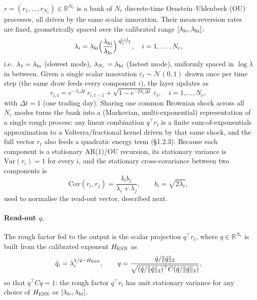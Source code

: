 \documentclass[11pt,a4paper]{article}
\begin{document}
$r=(r_1,\ldots,r_{N_r})\in\mathbb{R}^{N_r}$ is a bank of $N_r$
discrete-time Ornstein--Uhlenbeck (OU) processes, all driven by the
same scalar innovation. Their mean-reversion rates are fixed,
geometrically spaced over the calibrated range
$[\lambda_{\rm lo},\lambda_{\rm hi}]$:
\begin{equation}
  \lambda_i = \lambda_{\rm lo}\Bigl(\frac{\lambda_{\rm hi}}{\lambda_{\rm lo}}\Bigr)^{\frac{i-1}{N_r-1}},
  \quad i=1,\ldots,N_r,
  \label{eq:geomspace}
\end{equation}
i.e.\ $\lambda_1=\lambda_{\rm lo}$ (slowest mode), $\lambda_{N_r}=\lambda_{\rm
hi}$ (fastest mode), uniformly spaced in $\log\lambda$ in between.
Given a single scalar innovation $\varepsilon_t\sim\mathcal N(0,1)$
drawn once per time step (the same draw feeds every component $i$), the
layer updates as
\begin{equation}
  r_{i,t} = e^{-\lambda_i\Delta t}\,r_{i,t-1} + \sqrt{1-e^{-2\lambda_i\Delta t}}\,\varepsilon_t,
  \quad i=1,\ldots,N_r,
  \label{eq:rlayer}
\end{equation}
with $\Delta t=1$ (one trading day). Sharing one common Brownian shock
across all $N_r$ modes turns the bank into a (Markovian,
multi-exponential) representation of a single rough process: any
linear combination $q^\top r_t$ is a finite sum-of-exponentials
approximation to a Volterra/fractional kernel driven by that same
shock, and the full vector $r_t$ also feeds a quadratic energy term
(\S1.2.3). Because each component is a stationary AR(1)/OU recursion,
its stationary variance is $\mathrm{Var}(r_i)=1$ for every $i$, and the
stationary cross-covariance between two components is
\begin{equation}
  \mathrm{Cov}(r_i,r_j) = \frac{b_ib_j}{\lambda_i+\lambda_j},\qquad b_i=\sqrt{2\lambda_i},
  \label{eq:crosscov}
\end{equation}
used to normalise the read-out vector, described next.

\paragraph{Read-out $q$.} The rough factor fed to the output is the
scalar projection $q^\top r_t$, where $q\in\mathbb{R}^{N_r}$ is built
from the calibrated exponent $H_{\rm ESN}$ as
\begin{equation}
  \tilde q_i = \lambda_i^{1/2-H_{\rm ESN}},\qquad
  q = \frac{\tilde q/\|\tilde q\|_2}{\sqrt{(\tilde q/\|\tilde q\|_2)^\top C(\tilde q/\|\tilde q\|_2)}},
  \label{eq:readout_q}
\end{equation}
so that $q^\top Cq=1$: the rough factor $q^\top r_t$ has unit
stationary variance for any choice of $H_{\rm ESN}$ or
$[\lambda_{\rm lo},\lambda_{\rm hi}]$.
\end{document}

